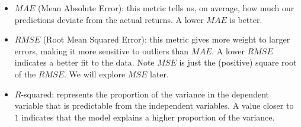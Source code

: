 \documentclass[a4paper,12pt,titlepage]{article}
\numberwithin{equation}{section}
\begin{document}
\begin{itemize}
	
	\item $MAE$ (Mean Absolute Error): this metric tells us, on average, how much our predictions deviate 
		from the actual returns. A lower $MAE$ is better.

	\item $RMSE$ (Root Mean Squared Error): this metric gives more weight to larger errors, making it more 
		sensitive to outliers than $MAE$. A lower $RMSE$ indicates a better fit to the data. Note $MSE$ is just
		the (positive) square root of the $RMSE$. We will explore $MSE$ later.
	
	\item $R$-squared: represents the proportion of the variance in the dependent variable that is 
		predictable from the independent variables. A value closer to $1$ indicates that the model 
		explains a higher proportion of the variance.

\end{itemize}
\end{document}
